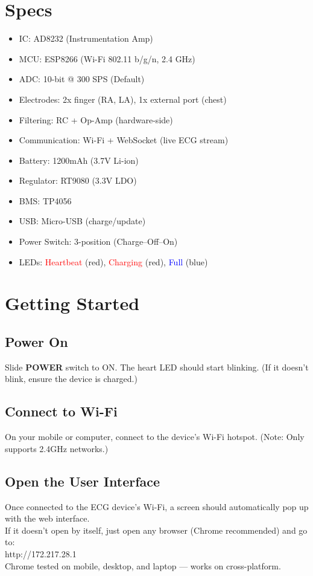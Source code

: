 \documentclass[twoside]{article}
\begin{document}
\section{Specs}
\begin{itemize}[leftmargin=*]
  \item IC: AD8232 (Instrumentation Amp)
  \item MCU: ESP8266 (Wi-Fi 802.11 b/g/n, 2.4 GHz)
  \item ADC: 10-bit @ 300 SPS (Default)
  \item Electrodes: 2x finger (RA, LA), 1x external port (chest)
  \item Filtering: RC + Op-Amp (hardware-side)
  \item Communication: Wi-Fi + WebSocket (live ECG stream)
  \item Battery: 1200mAh (3.7V Li-ion)
  \item Regulator: RT9080 (3.3V LDO)
  \item BMS: TP4056
  \item USB: Micro-USB (charge/update)
  \item Power Switch: 3-position (Charge–Off–On)
  \item LEDs: \textcolor{red}{Heartbeat} (red), \textcolor{red}{Charging} (red), \textcolor{blue}{Full} (blue)
\end{itemize}


\section{Getting Started}
\subsection{Power On}
Slide \textbf{POWER} switch to ON. The heart LED should start blinking.
(If it doesn't blink, ensure the device is charged.)
\subsection{Connect to Wi-Fi}
On your mobile or computer, connect to the device’s Wi-Fi hotspot.
(Note: Only supports 2.4GHz networks.)
\subsection{Open the User Interface}
Once connected to the ECG device's Wi-Fi, a screen should automatically pop up with the web interface. \\
If it doesn’t open by itself, just open any browser (Chrome recommended) and go to: \\
http://172.217.28.1 \\
Chrome tested on mobile, desktop, and laptop — works on cross-platform.
\end{document}
